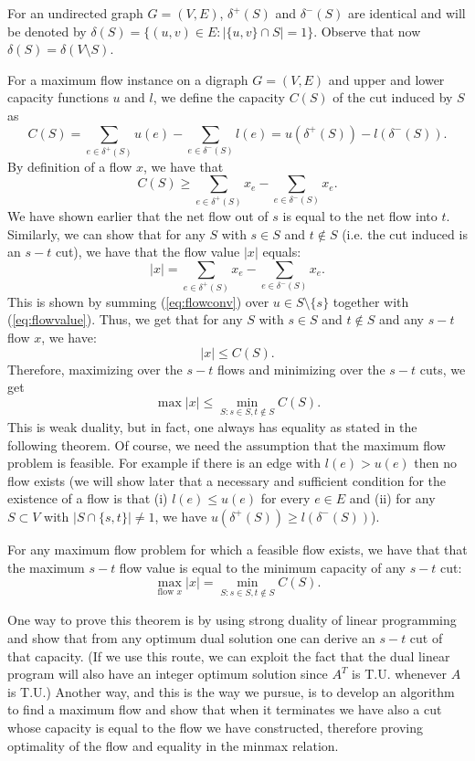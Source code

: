 \documentclass[12pt]{article}
\begin{document}
For an undirected graph $G=(V,E)$, $\delta^+(S)$ and $\delta^-(S)$ are
identical and will be denoted by $\delta(S)=\{(u,v)\in E: |\{u,v\}\cap
S|=1\}$. Observe that now $\delta(S)=\delta(V\setminus S)$.

For a maximum flow instance on a digraph $G=(V,E)$ and upper and lower
capacity functions $u$ and $l$, we define the capacity $C(S)$ of the
cut induced by $S$ as 
$$C(S)=\sum_{e\in \delta^+(S)} u(e) -\sum_{e\in \delta^-(S)} l(e) =
u(\delta^+(S)) - l(\delta^-(S)).$$
By definition of a flow $x$, we have that $$C(S) \geq \sum_{e\in
  \delta^+(S)} x_e -\sum_{e\in \delta^-(S)} x_e. $$
We have shown earlier that the net flow out of $s$ is equal to the net
flow into $t$. Similarly, we can show that for any $S$ with $s\in S$
and $t\notin S$ (i.e. the cut induced is an $s-t$ cut), we have that the flow value $|x|$ equals:
$$|x|=\sum_{e\in \delta^+(S)} x_e -\sum_{e\in \delta^-(S)} x_e.$$ This
is shown by summing (\ref{eq:flowconv}) over $u\in S\setminus\{s\}$
together with (\ref{eq:flowvalue}). Thus, we get that for any $S$ with
$s\in S$ and $t\notin S$ and any $s-t$ flow $x$, we have:
$$|x|\leq C(S).$$ Therefore, maximizing over the $s-t$ flows and
minimizing over the $s-t$ cuts, we get 
$$\max |x| \leq \min_{S: s\in S, t\notin S} C(S).$$
This is weak duality, but in fact, one always has equality as stated
in the following theorem. Of course, we need the assumption that the
maximum flow problem is feasible. For example if there is an edge with
$l(e)>u(e)$ then no flow exists (we will show later that a necessary
and sufficient condition for the existence of a flow is that (i)
$l(e)\leq u(e)$ for every $e\in E$ and (ii) for any $S\subset V$ with
$|S\cap\{s,t\}| \neq 1$, we have $u(\delta^+(S))\geq l(\delta^-(S))$). 

\begin{theorem} \label{thm:maxflowmincut}
  For any maximum flow problem for which a feasible flow exists, we
  have that that the maximum $s-t$ flow value is equal to the minimum
  capacity of any $s-t$ cut:
$$\max_{\text{flow } x} |x|=\min_{S: s\in S, t\notin S} C(S).$$
\end{theorem} 

One way to prove this theorem is by using strong duality of linear
programming and show that from any optimum dual solution one can
derive an $s-t$ cut of that capacity. (If we use this route, we can exploit the fact that the dual linear program will also have an integer optimum solution since $A^T$ is T.U. whenever $A$ is T.U.) 
Another way, and this is the
way we pursue, is to develop an algorithm to find a maximum
flow and show that when it terminates we have also a cut whose
capacity is equal to the flow we have constructed, therefore proving
optimality of the flow and equality in the minmax relation. 
\end{document}
